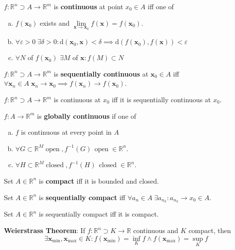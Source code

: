 \documentclass[letterpaper,11pt]{amsart}
\newcommand{\dist}[2]{\textrm{d}\left( {#1}, {#2} \right)}
\newcommand{\reals}{\mathbb{R}}
\newcommand{\keyphrase}[1]{\textbf{#1}}
\DeclareMathOperator{\open}{open}
\DeclareMathOperator{\closed}{closed}
\begin{document}
$f:\reals^{n}\supset{}A\to\reals^{m}$ is \keyphrase{continuous}
at point $x_{0}\in{}A$ iff one of
\begin{enumerate}[(a)]
    \item $f(\mathbf{x}_{0})$ exists and
        $\lim\limits_{\mathbf{x}\to\mathbf{x}_{0}} f(\mathbf{x}) 
            = f(\mathbf{x}_{0})$.
    \item $\forall{}\varepsilon>0\;\exists\delta>0:
        \dist{\mathbf{x}_{0}}{\mathbf{x}} < \delta
        \implies \dist{f(\mathbf{x}_{0})}{f(\mathbf{x})} < \varepsilon$
    \item $\forall{}N$ of $f(\mathbf{x}_{0})$ $\exists{}M$
        of $\mathbf{x}:f(M)\subset{}N$
\end{enumerate}

$f:\reals^{n}\supset{}A\to\reals^{m}$ is \keyphrase{sequentially continuous}
at $\mathbf{x}_{0}\in{}A$ iff $\forall \mathbf{x}_{n}\in{}A\;
\mathbf{x}_{n}\to{}\mathbf{x}_{0}
\implies f(\mathbf{x}_{n})\to{}f(\mathbf{x}_{0})$.

$f:\reals^{n}\supset{}A\to\reals^{m}$ is continuous
at $x_{0}$ iff it is sequentially continuous at $x_{0}$.

$f:A\to\reals^{m}$ is \keyphrase{globally continuous} if one of
\begin{enumerate}[(a)]
    \item $f$ is continuous at every point in $A$
    \item $\forall G\subset\reals^{M} \open,
        f^{-1}(G) \,\open\in\reals^{n}$.
    \item $\forall H\subset\reals^{M} \closed, 
        f^{-1}(H) \,\closed\in\reals^{n}$.
\end{enumerate}

Set $A\in\reals^{n}$ is \keyphrase{compact} iff it is bounded and closed.

Set $A\in\reals^{n}$ is \keyphrase{sequentially compact} iff
$\forall a_{n}\in{A} \; \exists a_{n_{k}} : a_{n_{k}}\to{}x_{0}\in{}A$.


Set $A\in\reals^{n}$ is sequentially compact iff it is compact.

\keyphrase{Weierstrass Theorem}:
If $f:\reals^{n}\supset{}K\to{}\reals$ continuous and $K$ compact, then
\[
    \exists \mathbf{x}_{\min}, \mathbf{x}_{\max} \in{ K} : 
    f\left( \mathbf{x}_{\min} \right) = \inf_{K} f
    \wedge f\left( \mathbf{x}_{\max} \right) = \sup_{K} f
\]
\end{document}
